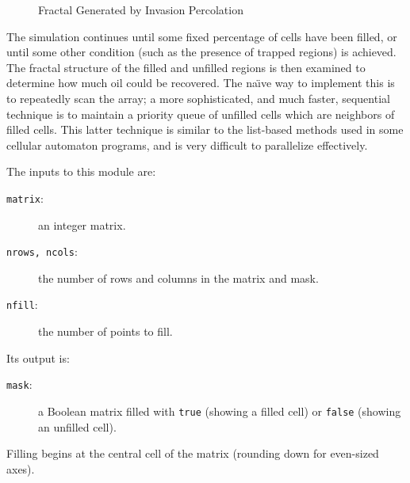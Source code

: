 \begin{figure}
\begin{center}
\end{center}
\caption{Fractal Generated by Invasion Percolation\label{f:invperc2}}
\end{figure}

The simulation continues until
some fixed percentage of cells have been filled,
or until some other condition
(such as the presence of trapped regions)
is achieved.
The fractal structure of the filled and unfilled regions
is then examined to determine how much oil could be recovered.
The na\"{\i}ve way to implement this is to repeatedly scan the array;
a more sophisticated, and much faster, sequential technique
is to maintain a priority queue of unfilled cells
which are neighbors of filled cells.
This latter technique is similar to the list-based methods used in some cellular automaton programs,
and is very difficult to parallelize effectively.

The inputs to this module are:
\begin{description}
\item[{\tt{matrix}}:]
	an integer matrix.
\item[{\tt{nrows, ncols}}:]
	the number of rows and columns in the matrix and mask.
\item[{\tt{nfill}}:]
	the number of points to fill.
\end{description}
Its output is:
\begin{description}
\item[{\tt{mask}}:]
	a Boolean matrix filled with {\tt{true}} (showing a filled cell) or {\tt{false}} (showing an unfilled cell).
\end{description}
Filling begins at the central cell of the matrix
(rounding down for even-sized axes).
